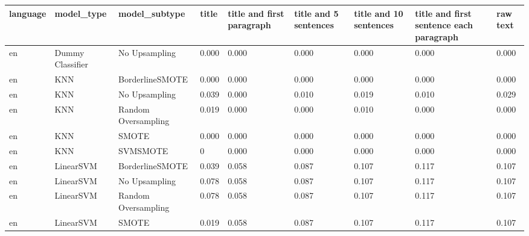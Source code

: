 \begin{tabular}{lllllllll}
\toprule
language &                   model\_type &       model\_subtype & title & title and first paragraph & title and 5 sentences & title and 10 sentences & title and first sentence each paragraph &  raw text \\
\midrule
      en &             Dummy Classifier &       No Upsampling & 0.000 &                     0.000 &                 0.000 &                  0.000 &                                   0.000 &     0.000 \\
      en &                          KNN &     BorderlineSMOTE & 0.000 &                     0.000 &                 0.000 &                  0.000 &                                   0.000 &     0.000 \\
      en &                          KNN &       No Upsampling & 0.039 &                     0.000 &                 0.010 &                  0.019 &                                   0.010 &     0.029 \\
      en &                          KNN & Random Oversampling & 0.019 &                     0.000 &                 0.000 &                  0.010 &                                   0.000 &     0.000 \\
      en &                          KNN &               SMOTE & 0.000 &                     0.000 &                 0.000 &                  0.000 &                                   0.000 &     0.000 \\
      en &                          KNN &            SVMSMOTE &     0 &                     0.000 &                 0.000 &                  0.000 &                                   0.000 &     0.000 \\
      en &                    LinearSVM &     BorderlineSMOTE & 0.039 &                     0.058 &                 0.087 &                  0.107 &                                   0.117 &     0.107 \\
      en &                    LinearSVM &       No Upsampling & 0.078 &                     0.058 &                 0.087 &                  0.107 &                                   0.117 &     0.107 \\
      en &                    LinearSVM & Random Oversampling & 0.078 &                     0.058 &                 0.087 &                  0.107 &                                   0.117 &     0.107 \\
      en &                    LinearSVM &               SMOTE & 0.019 &                     0.058 &                 0.087 &                  0.107 &                                   0.117 &     0.107 \\

\end{tabular}
